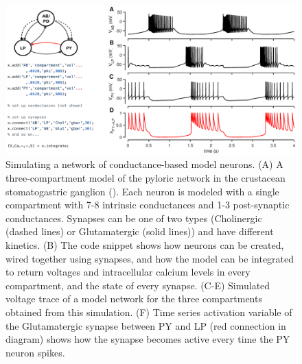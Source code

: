 \documentclass{frontiersSCNS} %
\begin{document}
\begin{figure}[!htb]
	\centering
	\includegraphics[width=1.0\linewidth]{gfx/figure_network}
	\caption{Simulating a network of conductance-based model neurons. (A) A three-compartment model of the pyloric network in the crustacean stomatogastric ganglion (\cite{prinzSimilarNetworkActivity2004}). Each neuron is modeled with a single compartment with 7-8 intrinsic conductances and 1-3 post-synaptic conductances. Synapses can be one of two types (Cholinergic (dashed lines) or Glutamatergic (solid lines)) and have different kinetics. (B) The code snippet shows how neurons can be created, wired together using synapses, and how the model can be integrated to return voltages and intracellular calcium levels in every compartment, and the state of every synapse. (C-E) Simulated voltage trace of a model network for the three compartments obtained from this simulation. (F) Time series activation variable of the Glutamatergic synapse between PY and LP (red connection in diagram) shows how the synapse becomes active every time the PY neuron spikes.}
	\label{fig:figurenetwork}
\end{figure}



\clearpage
\end{document}
